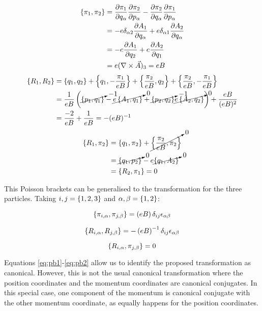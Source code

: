 \begin{align*}
\left\lbrace \pi_1, \pi_2 \right\rbrace &= \frac{\partial \pi_1}{\partial q_{\alpha}}\frac{\partial \pi_2}{\partial p_{\alpha}} - \frac{\partial \pi_2}{\partial q_{\alpha}}\frac{\partial \pi_1}{\partial p_{\alpha}}\\
&= -e\delta_{\alpha 2}\frac{\partial A_1}{\partial q_{\alpha}} +e\delta_{\alpha 1}\frac{\partial A_2}{\partial q_{\alpha}}\\
&= -e\frac{\partial A_1}{\partial q_{2}}  + e\frac{\partial A_2}{\partial q_{1}}\\
&= e(\nabla \times \vec{A})_3 = eB
\end{align*}
\begin{align*}
\left\lbrace R_1, R_2 \right\rbrace &= \left\lbrace q_1, q_2 \right\rbrace + \left\lbrace q_1, -\frac{\pi_1}{eB} \right\rbrace +\left\lbrace \frac{\pi_2}{eB}, q_2 \right\rbrace + \left\lbrace \frac{\pi_2}{eB}, -\frac{\pi_1}{eB} \right\rbrace\\
&= \frac{1}{eB}\left( \cancelto{-1}{\left\lbrace p_1, q_1 \right\rbrace}- \cancelto{0}{e\left\lbrace A_1, q_1 \right\rbrace}+\cancelto{-1}{\left\lbrace p_2, q_2 \right\rbrace} \cancelto{0}{e\left\lbrace A_2, q_2 \right\rbrace} \right) +\frac{eB}{(eB)^2}\\
&= \frac{-2}{eB}+ \frac{1}{eB} = -(eB)^{-1}
\end{align*}
\begin{align*}
\left\lbrace R_{1}, \pi_{2} \right\rbrace &= \left\lbrace q_1, \pi_2 \right\rbrace+\cancelto{0}{\left\lbrace \frac{\pi_2}{eB}, \pi_2 \right\rbrace}\\
&= \cancelto{0}{\left\lbrace q_1, p_2 \right\rbrace}-e\cancelto{0}{\left\lbrace q_1, A_2 \right\rbrace}\\
&= \left\lbrace R_2, \pi_1 \right\rbrace = 0
\end{align*}

This Poisson brackets can be generalised to the transformation for the three particles. Taking $i,j = \left\lbrace 1,2, 3 \right\rbrace$ and $\alpha,\beta=\left\lbrace 1, 2 \right\rbrace$:

\begin{equation}
\left\lbrace \pi_{i,\alpha}, \pi_{j,\beta} \right\rbrace=\left( eB \right)\delta_{ij}\epsilon_{\alpha \beta}  
\label{eq:pb1}
\end{equation}

\begin{equation}
\left\lbrace R_{i,\alpha}, R_{j,\beta} \right\rbrace= -\left( eB \right)^{-1} \delta_{ij}\epsilon_{\alpha \beta}  
\label{eq:pb2}
\end{equation}

\begin{equation}
\left\lbrace R_{i,\alpha}, \pi_{j,\beta} \right\rbrace=0 
\label{eq:pb3} 
\end{equation}

Equations \eqref{eq:pb1}-\eqref{eq:pb2} allow us to identify the proposed transformation as canonical. However, this is not the usual canonical transformation where the position coordinates and the momentum coordinates are canonical conjugates. In this special case, one component of the momentum is canonical conjugate with the other momentum coordinate, as equally happens for the position coordinates.\\

